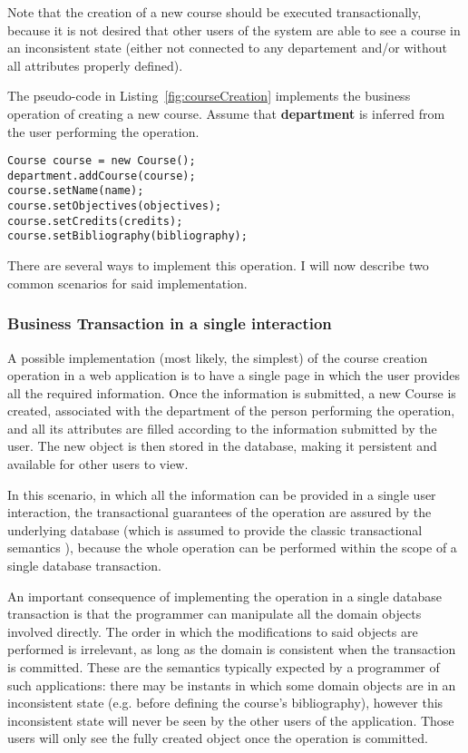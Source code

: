 \documentclass{llncs}
\begin{document}
Note that the creation of a new course should be executed
transactionally, because it is not desired that other users of the
system are able to see a course in an inconsistent state (either not
connected to any departement and/or without all attributes properly
defined).

The pseudo-code in Listing~\ref{fig:courseCreation} implements the
business operation of creating a new course. Assume that {\bf
  department} is inferred from the user performing the operation.

\begin{lstlisting}[float]
Course course = new Course();
department.addCourse(course);
course.setName(name);
course.setObjectives(objectives);
course.setCredits(credits);
course.setBibliography(bibliography);
\end{lstlisting}

There are several ways to implement this operation. I will now
describe two common scenarios for said implementation.

\subsubsection{Business Transaction in a single interaction}

A possible implementation (most likely, the simplest) of the course
creation operation in a web application is to have a single page in
which the user provides all the required information. Once the
information is submitted, a new Course is created, associated with the
department of the person performing the operation, and all its
attributes are filled according to the information submitted by the
user. The new object is then stored in the database, making it
persistent and available for other users to view.

In this scenario, in which all the information can be provided in a
single user interaction, the transactional guarantees of the operation
are assured by the underlying database (which is assumed to provide
the classic transactional semantics \cite{gray1981transaction}),
because the whole operation can be performed within the scope of a
single database transaction.

An important consequence of implementing the operation in a single
database transaction is that the programmer can manipulate all the
domain objects involved directly. The order in which the modifications
to said objects are performed is irrelevant, as long as the domain is
consistent when the transaction is committed. These are the semantics
typically expected by a programmer of such applications: there may be
instants in which some domain objects are in an inconsistent state
(e.g. before defining the course's bibliography), however this
inconsistent state will never be seen by the other users of the
application. Those users will only see the fully created object once
the operation is committed.
\end{document}
